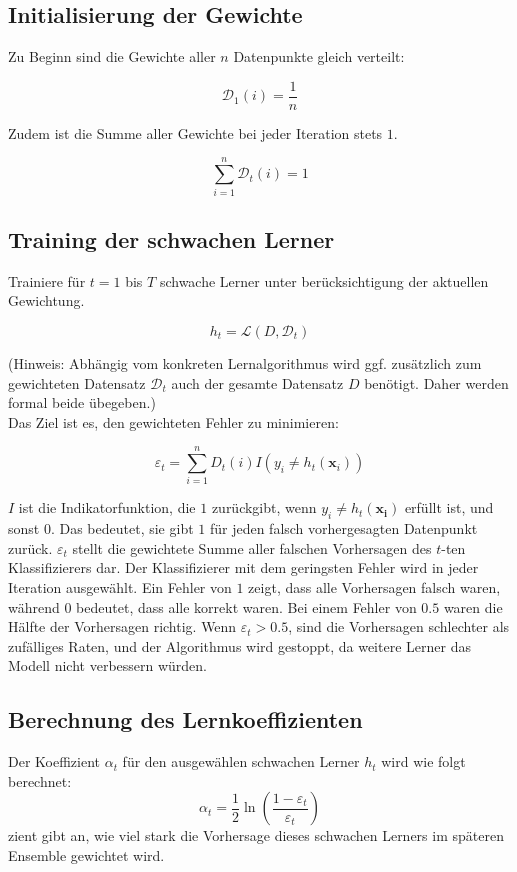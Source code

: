 \documentclass[11pt,a4paper,oneside]{scrartcl}
\begin{document}
\subsection*{Initialisierung der Gewichte}
Zu Beginn sind die Gewichte aller $n$ Datenpunkte gleich verteilt:

$$
    \mathcal{D}_1(i) = \frac{1}{n}
$$

Zudem ist die Summe aller Gewichte bei jeder Iteration stets $1$.

$$
    \sum_{i=1}^n \mathcal{D}_t(i) = 1
$$

\subsection*{Training der schwachen Lerner}
Trainiere für $t=1$ bis $T$ schwache Lerner unter berücksichtigung der aktuellen Gewichtung.

$$
    h_t = \mathcal{L}(D, \mathcal{D}_t)
$$

(Hinweis: Abhängig vom konkreten Lernalgorithmus wird ggf. zusätzlich zum gewichteten Datensatz $\mathcal{D}_t$
auch der gesamte Datensatz $D$ benötigt. Daher werden formal beide übegeben.)\\
Das Ziel ist es, den gewichteten Fehler zu minimieren:

$$
    \varepsilon_t = \sum_{i=1}^n {D}_t(i) I\left(y_i \neq h_t\left(\boldsymbol{x}_i\right)\right)
$$

$I$ ist die Indikatorfunktion, die $1$ zurückgibt, wenn $y_i\neq h_t(\boldsymbol{x_i})$ erfüllt ist, und
sonst $0$. Das bedeutet, sie gibt $1$ für jeden falsch vorhergesagten Datenpunkt zurück. $\varepsilon_t$
stellt die gewichtete Summe aller falschen Vorhersagen des $t$-ten Klassifizierers dar. Der Klassifizierer
mit dem geringsten Fehler wird in jeder Iteration ausgewählt. Ein Fehler von $1$ zeigt, dass alle
Vorhersagen falsch waren, während $0$ bedeutet, dass alle korrekt waren. Bei einem Fehler von $0.5$
waren die Hälfte der Vorhersagen richtig. Wenn $\varepsilon_t > 0.5$, sind die Vorhersagen schlechter
als zufälliges Raten, und der Algorithmus wird gestoppt, da weitere Lerner das Modell nicht verbessern würden.
\subsection*{Berechnung des Lernkoeffizienten}
Der Koeffizient $\alpha_t$ für den ausgewählen schwachen Lerner $h_t$ wird wie folgt berechnet:
$$
    \alpha_t = \frac{1}{2}\ln\left(\frac{1-\varepsilon_t}{\varepsilon_t}\right)
$$
zient gibt an, wie viel stark die Vorhersage dieses schwachen Lerners im späteren Ensemble
gewichtet wird.
\end{document}
